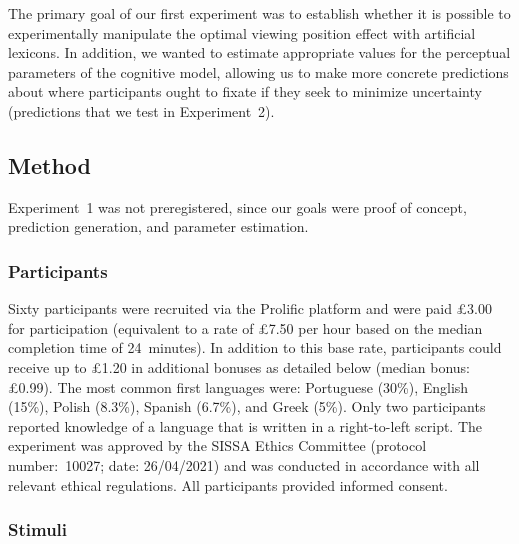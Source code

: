 \documentclass[doc,biblatex,floatsintext]{apa7}
\begin{document}
The primary goal of our first experiment was to establish whether it is possible to experimentally manipulate the optimal viewing position effect with artificial lexicons. In addition, we wanted to estimate appropriate values for the perceptual parameters of the cognitive model, allowing us to make more concrete predictions about where participants ought to fixate if they seek to minimize uncertainty (predictions that we test in Experiment~2).

\subsection{Method}

Experiment~1 was not preregistered, since our goals were proof of concept, prediction generation, and parameter estimation.

\subsubsection{Participants}

Sixty participants were recruited via the Prolific platform and were paid £3.00 for participation (equivalent to a rate of £7.50 per hour based on the median completion time of 24~minutes). In addition to this base rate, participants could receive up to £1.20 in additional bonuses as detailed below (median bonus: £0.99). The most common first languages were: Portuguese (30\%), English (15\%), Polish (8.3\%), Spanish (6.7\%), and Greek (5\%). Only two participants reported knowledge of a language that is written in a right-to-left script. The experiment was approved by the SISSA Ethics Committee (protocol number:~10027; date: 26/04/2021) and was conducted in accordance with all relevant ethical regulations. All participants provided informed consent.

\subsubsection{Stimuli}
\end{document}
